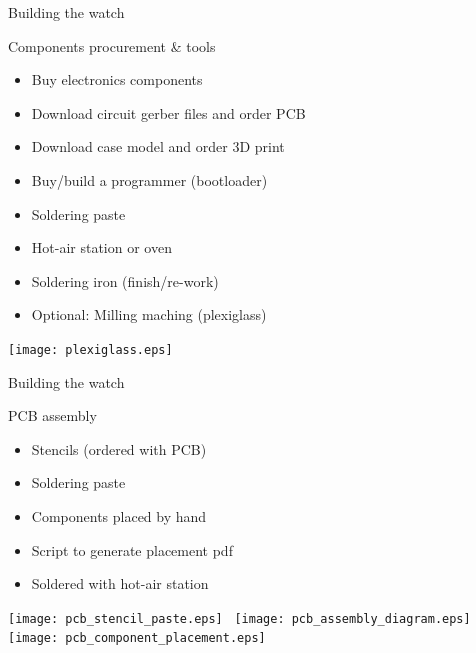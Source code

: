 \documentclass[compress,red]{beamer}
\begin{document}
\begin{frame}{Building the watch}

  Components procurement \& tools

  \begin{itemize}
  \item Buy electronics components
  \item Download circuit gerber files and order PCB
  \item Download case model and order 3D print
  \item Buy/build a programmer (bootloader)
  \item Soldering paste
  \item Hot-air station or oven
  \item Soldering iron (finish/re-work)
  \item Optional: Milling maching (plexiglass)
  \end{itemize}

  \begin{center}
    \texttt{[image: plexiglass.eps]}
  \end{center}


\end{frame}

\begin{frame}{Building the watch}

  PCB assembly

  \begin{itemize}
  \item Stencils (ordered with PCB)
  \item Soldering paste
  \item Components placed by hand
  \item Script to generate placement pdf
  \item Soldered with hot-air station
  \end{itemize}

  \begin{center}
    \texttt{[image: pcb\_stencil\_paste.eps]}~
    \texttt{[image: pcb\_assembly\_diagram.eps]}~
    \texttt{[image: pcb\_component\_placement.eps]}
  \end{center}


\end{frame}
\end{document}
